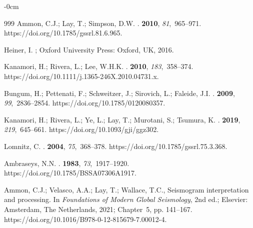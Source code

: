 \documentclass[sensors,article,accept,moreauthors,pdftex]{Definitions/mdpi}
\begin{document}
\begin{adjustwidth}{-\extralength}{0cm}
\begin{thebibliography}{999}
Ammon, C.J.; Lay, T.; Simpson, D.W.
.
 {\bf 2010}, {\em 81},~965--971.
\newblock
{https://doi.org/10.1785/gssrl.81.6.965}.

Heiner, I.
; Oxford
  University Press: Oxford, UK,  2016.

Kanamori, H.; Rivera, L.; Lee, W.H.K.
.
 {\bf 2010}, {\em
  183},~358--374.
\newblock
{https://doi.org/10.1111/j.1365-246X.2010.04731.x}.

Bungum, H.; Pettenati, F.; Schweitzer, J.; Sirovich, L.; Faleide, J.I.
.
 {\bf 2009},
  {\em 99},~2836--2854.
\newblock
 {https://doi.org/10.1785/0120080357}.

Kanamori, H.; Rivera, L.; Ye, L.; Lay, T.; Murotani, S.; Tsumura, K.
.
 {\bf 2019}, {\em
  219},~645--661.
\newblock
 {https://doi.org/10.1093/gji/ggz302}.

Lomnitz, C.
.
 {\bf 2004}, {\em 75},~368--378.
\newblock
 {https://doi.org/10.1785/gssrl.75.3.368}.

Ambraseys, N.N.
.
 {\bf 1983},
  {\em 73},~1917–1920.
\linebreak
{https://doi.org/10.1785/BSSA07306A1917}.

Ammon, C.J.; Velasco, A.A.; Lay, T.; Wallace, T.C., Seismogram interpretation
  and processing.
\newblock In {\em Foundations of Modern Global Seismology}, 2nd ed.; Elsevier:  Amsterdam, The Netherlands, %
2021; Chapter~5, pp. 141--167.
\newblock
{https://doi.org/10.1016/B978-0-12-815679-7.00012-4}.


\end{thebibliography}
\end{adjustwidth}
\end{document}
